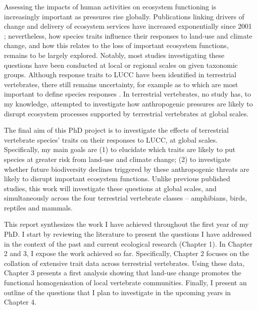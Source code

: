 Assessing the impacts of human activities on ecosystem functioning is increasingly important as pressures rise globally. Publications linking drivers of change and delivery of ecosystem services have increased exponentially since 2001 \citep{Hevia2017}; nevertheless, how species traits influence their responses to land-use and climate change, and how this relates to the loss of important ecosystem functions, remains to be largely explored.  Notably, most studies investigating these questions have been conducted at local or regional scales on given taxonomic groups. Although response traits to LUCC have been identified in terrestrial vertebrates, there still remains uncertainty, for example as to which are most important to define species responses \citep{Wheatley2017}. In terrestrial vertebrates, no study has, to my knowledge, attempted to investigate how anthropogenic pressures are likely to disrupt ecosystem processes supported by terrestrial vertebrates at global scales.
 
The final aim of this PhD project is to investigate the effects of terrestrial vertebrate species' traits on their responses to LUCC, at global scales. Specifically, my main goals are (1) to elucidate which traits are likely to put species at greater risk from land-use and climate change; (2) to investigate whether future biodiversity declines triggered by these anthropogenic threats are likely to disrupt important ecosystem functions. Unlike previous published studies, this work will investigate these questions at global scales, and simultaneously across the four terrestrial vertebrate classes -- amphibians, birds, reptiles and mammals.  

This report synthesizes the work I have achieved throughout the first year of my PhD. I start by reviewing the literature to present the questions I have addressed in the context of the past and current ecological research (Chapter 1). In Chapter 2 and 3, I expose the work achieved so far. Specifically, Chapter 2 focuses on the collation of extensive trait data across terrestrial vertebrates. Using these data, Chapter 3 presents a first analysis showing that land-use change promotes the functional homogenisation of local vertebrate communities. Finally, I present an outline of the questions that I plan to investigate in the upcoming years in Chapter 4.

